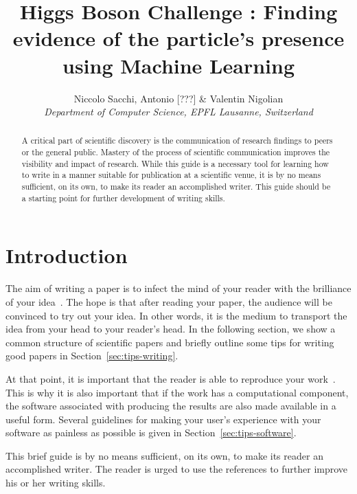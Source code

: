\documentclass[10pt,conference,compsocconf]{IEEEtran}
\begin{document}
\title{Higgs Boson Challenge : Finding evidence of the particle's presence using Machine Learning}

\author{
  Niccolo Sacchi, Antonio [???] \& Valentin Nigolian\\
  \textit{Department of Computer Science, EPFL Lausanne, Switzerland}
}

\maketitle

\begin{abstract}
  A critical part of scientific discovery is the
  communication of research findings to peers or the general public.
  Mastery of the process of scientific communication improves the
  visibility and impact of research. While this guide is a necessary
  tool for learning how to write in a manner suitable for publication
  at a scientific venue, it is by no means sufficient, on its own, to
  make its reader an accomplished writer. 
  This guide should be a starting point for further development of 
  writing skills.
\end{abstract}

\section{Introduction}

The aim of writing a paper is to infect the mind of your reader with
the brilliance of your idea~\cite{jones08}. 
The hope is that after reading your
paper, the audience will be convinced to try out your idea. In other
words, it is the medium to transport the idea from your head to your
reader's head. 
In the following
section, we show a common structure of scientific papers and briefly
outline some tips for writing good papers in
Section~\ref{sec:tips-writing}.

At that
point, it is important that the reader is able to reproduce your
work~\cite{schwab00,wavelab,gentleman05}. This is why it is also
important that if the work has a computational component, the software
associated with producing the results are also made available in a
useful form. Several guidelines for making your user's experience with
your software as painless as possible is given in
Section~\ref{sec:tips-software}.

This brief guide is by no means sufficient, on its own, to
make its reader an accomplished writer. The reader is urged to use the
references to further improve his or her writing skills.
\end{document}

